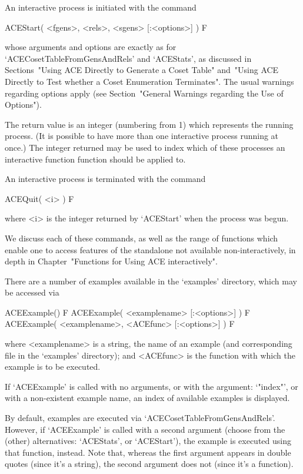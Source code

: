 An interactive {\ACE} process is initiated with the command

\>ACEStart( <fgens>, <rels>, <sgens> [:<options>] ) F

whose    arguments    and    options    are     exactly     as     for
`ACECosetTableFromGensAndRels'  and  `ACEStats',   as   discussed   in
Sections~"Using ACE Directly to Generate a Coset Table" and~"Using ACE
Directly to Test whether a Coset Enumeration  Terminates".  The  usual
warnings  regarding  options  apply  (see  Section~"General   Warnings
regarding the Use of Options").

The return value is an integer (numbering from 1) which represents the
running process. (It is possible to have  more  than  one  interactive
process running at once.) The integer returned may be  used  to  index
which of these  processes  an  interactive  function  {\ACE}  function
should be applied to.

An interactive{\ACE} process is terminated with the command

\>ACEQuit( <i> ) F

where <i> is the integer returned by `ACEStart' when the  process  was
begun.

We discuss each of these commands, as well as the range  of  functions
which enable one to access  features  of  the  {\ACE}  standalone  not
available non-interactively, in depth in Chapter~"Functions for  Using
ACE interactively".

\enditems


\beginitems

There are a number of examples available in the `examples'  directory,
which may be accessed via

\>ACEExample() F
\>ACEExample( <examplename> [:<options>] ) F
\>ACEExample( <examplename>, <ACEfunc> [:<options>] ) F

where  <examplename>  is  a  string,  the  name  of  an  example  (and
corresponding file in the `examples' directory); and <ACEfunc> is  the
{\ACE} function with which the example is to be executed. 

If `ACEExample' is called with no arguments,  or  with  the  argument:
`"index"', or with a non-existent example name, an index of  available
examples is displayed.

By default, examples are executed via  `ACECosetTableFromGensAndRels'.
However, if `ACEExample' is called with a second argument (choose from
the (other) alternatives: `ACEStats', or `ACEStart'), the  example  is
executed using that function, instead. Note that,  whereas  the  first
argument appears in double quotes (since it's a  string),  the  second
argument does not (since it's a function).

